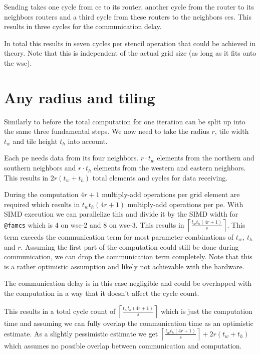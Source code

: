Sending takes one cycle from \ac{ce} to its router, another cycle from the router to its neighbors routers and a third cycle from these routers to the neighbors \acp{ce}. This results in three cycles for the communication delay.

In total this results in seven cycles per stencil operation that could be achieved in theory.
Note that this is independent of the actual grid size (as long as it fits onto the \ac{wse}).

\section{Any radius and tiling}
Similarly to before the total computation for one iteration can be split up into the same three fundamental steps. We now need to take the radius $r$, tile width $t_w$ and tile height $t_h$ into account.

Each \ac{pe} needs data from its four neighbors. $r\cdot t_w$ elements from the northern and southern neighbors and $r\cdot t_h$ elements from the western and eastern neighbors. This results in $2r(t_w+t_h)$ total elements and cycles for data receiving.

During the computation $4r+1$ multiply-add operations per grid element are required which results in $t_wt_h(4r+1)$ multiply-add operations per \ac{pe}. With SIMD execution we can parallelize this and divide it by the SIMD width for \texttt{@famcs} which is 4 on wse-2 and 8 on wse-3. This results in $\left\lceil\frac{t_wt_h(4r+1)}{s}\right\rceil$. This term exceeds the communication term for most parameter combinations of $t_w,\ t_h$ and $r$. Assuming the first part of the computation could still be done during communication, we can drop the communication term completely. Note that this is a rather optimistic assumption and likely not achievable with the hardware.

The communication delay is in this case negligible and could be overlapped with the computation in a way that it doesn't affect the cycle count. 

This results in a total cycle count of $\left\lceil\frac{t_wt_h(4r+1)}{s}\right\rceil$ which is just the computation time and assuming we can fully overlap the communication time as an optimistic estimate. As a slightly pessimistic estimate we get $\left\lceil\frac{t_wt_h(4r+1)}{s}\right\rceil+2r(t_w+t_h)$ which assumes no possible overlap between communication and computation. 

